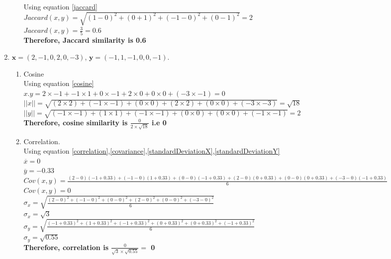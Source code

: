 \documentclass{article}
\begin{document}
\begin{enumerate}
\begin{enumerate}
        Using equation \ref{jaccard}\\
        $Jaccard(x,y) = \sqrt{(1-0)^2+(0+1)^2+(-1-0)^2+(0-1)^2} = 2$\\
        $Jaccard(x,y) = \frac{3}{5} = 0.6$\\
        \textbf{Therefore, Jaccard similarity is 0.6}\\
        \end{enumerate}
    \item $\textbf{x} = (2,-1,0,2,0,-3)$, $\textbf{y} = (-1,1,-1,0,0,-1)$.\\ 
        \begin{enumerate}
        \item Cosine\\
        Using equation \ref{cosine}\\
        $x.y = 2\times-1 + -1\times1 + 0\times-1 +  2\times0 + 0\times0 + (-3\times-1) = 0$\\
        $||x|| = \sqrt{(2\times2)+(-1\times-1)+(0\times0)+(2\times2)+(0\times0)+(-3\times-3)} = \sqrt{18}$\\
        $||y|| = \sqrt{(-1\times-1)+(1\times1)+(-1\times-1)+(0\times0)+(0\times0)+(-1\times-1)} = 2$\\
        \textbf{Therefore, cosine similarity is $\frac{0}{2\times\sqrt{18}}$ i.e 0}
        \item Correlation.\\
        Using equation \ref{correlation},\ref{covariance},\ref{standardDeviationX},\ref{standardDeviationY}\\
        $\overline{x} = 0$ \\
        $\overline{y} = -0.33$\\
        $Cov(x,y) = \frac{(2-0)(-1+0.33)+(-1-0)(1+0.33)+(0-0)(-1+0.33)+(2-0)(0+0.33)+(0-0)(0+0.33)+(-3-0)(-1+0.33)}{6}$\\
        $Cov(x,y) = 0$\\
        $\sigma_x = \sqrt{\frac{(2-0)^2+(-1-0)^2+(0-0)^2+(2-0)^2+(0-0)^2+(-3-0)^2}{6}}$\\
        $\sigma_x = \sqrt{3}$\\
        $\sigma_y = \sqrt{\frac{(-1+0.33)^2+(1+0.33)^2+(-1+0.33)^2+(0+0.33)^2+(0+0.33)^2+(-1+0.33)^2}{6}}$\\
        $\sigma_y = \sqrt{0.55}$\\
        \textbf{Therefore, correlation is $\frac{0}{\sqrt{3}\times\sqrt{0.55}} =$ 0}\\
        \end{enumerate}
\end{enumerate}
\end{document}
